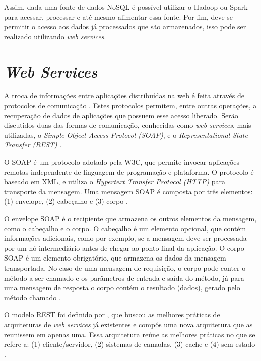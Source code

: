 Assim, dada uma fonte de dados NoSQL é possível utilizar o Hadoop ou Spark para acessar,
processar e até mesmo alimentar essa fonte. Por fim, deve-se permitir o acesso aos dados
já processados que são armazenados, isso pode ser realizado utilizando \textit{web services}. 


\section{\textit{Web Services}}
\label{sec:api}

A troca de informações entre aplicações distribuídas na web é feita através de protocolos de 
comunicação \cite{schepke2010avaliaccao}. Estes protocolos permitem, entre outras operações, a 
recuperação de dados de aplicações que possuem esse acesso liberado. Serão discutidos duas 
das formas de comunicação, conhecidas como \textit{web services}, mais utilizadas, o 
\textit{Simple Object Access Protocol (SOAP)}, e o \textit{Representational State 
Transfer (REST)} \cite{lima2012}.

O SOAP é um protocolo adotado pela W3C, que permite invocar aplicações remotas independente de 
linguagem de programação e plataforma. O protocolo é baseado em XML, e utiliza o 
\textit{Hypertext Transfer Protocol (HTTP)} para transporte da mensagem. Uma mensagem SOAP é 
composta por três elementos: (1) envelope, (2) cabeçalho e (3) corpo \cite{suda2003soap}.

O envelope SOAP é o recipiente que armazena os outros elementos da mensagem, como o cabeçalho 
e o corpo.  O cabeçalho é um elemento opcional, que contém informações adicionais, como por 
exemplo, se a mensagem deve ser processada por um nó intermediário antes de chegar ao ponto 
final da aplicação. O corpo SOAP é um elemento obrigatório, que armazena os dados da mensagem 
transportada. No caso de uma mensagem de requisição, o corpo pode conter o método a ser 
chamado e os parâmetros de entrada e saída do método, já para uma mensagem de resposta o 
corpo contém o resultado (dados), gerado pelo método chamado \cite{suda2003soap}.

O modelo REST foi definido por , que buscou as melhores 
práticas de arquiteturas de \textit{web services} já existentes e compôs uma nova arquitetura 
que as reunissem em apenas uma. Essa arquitetura reúne as melhores práticas no que se refere 
a: (1) cliente/servidor, (2) sistemas de camadas, (3) cache e (4) sem estado 
\cite{fielding2000architectural}.

